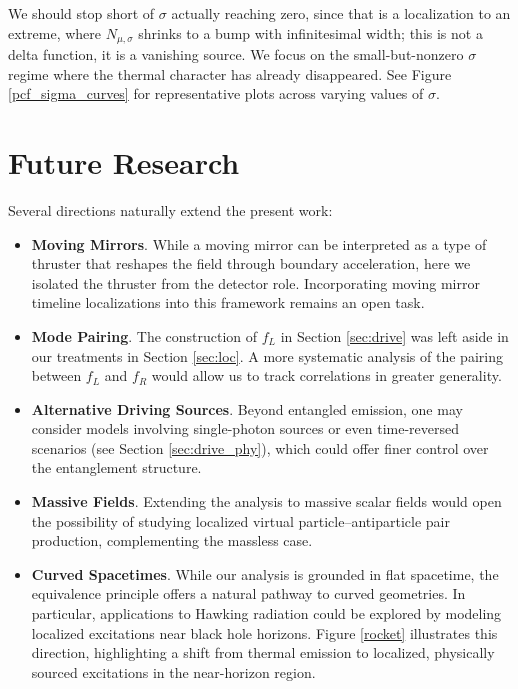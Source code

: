 \documentclass[12pt,a4paper]{article}
\begin{document}
We should stop short of $\sigma$ actually reaching zero, since that is a localization to an extreme, where $N_{\mu,\sigma}$ shrinks to a bump with infinitesimal width; this is not a delta function, it is a vanishing source. We focus on the small-but-nonzero $\sigma$ regime where the thermal character has already disappeared. See Figure \ref{pcf_sigma_curves} for representative plots across varying values of $\sigma$.

\section{Future Research} \label{sec:future}

Several directions naturally extend the present work:
\begin{itemize}
\item {\bf Moving Mirrors}. While a moving mirror can be interpreted as a type of thruster that reshapes the field through boundary acceleration, here we isolated the thruster from the detector role. Incorporating moving mirror timeline localizations into this framework remains an open task.

\item {\bf Mode Pairing}. The construction of $f_L$ in Section \ref{sec:drive} was left aside in our treatments in Section \ref{sec:loc}. A more systematic analysis of the pairing between $f_L$ and $f_R$ would allow us to track correlations in greater generality.

\item {\bf Alternative Driving Sources}. Beyond entangled emission, one may consider models involving single-photon sources or even time-reversed scenarios (see Section \ref{sec:drive_phy}), which could offer finer control over the entanglement structure.

\item {\bf Massive Fields}. Extending the analysis to massive scalar fields would open the possibility of studying localized virtual particle–antiparticle pair production, complementing the massless case.

\item {\bf Curved Spacetimes}. While our analysis is grounded in flat spacetime, the equivalence principle offers a natural pathway to curved geometries. In particular, applications to Hawking radiation could be explored by modeling localized excitations near black hole horizons. Figure \ref{rocket} illustrates this direction, highlighting a shift from thermal emission to localized, physically sourced excitations in the near-horizon region.
\end{itemize}
\end{document}
